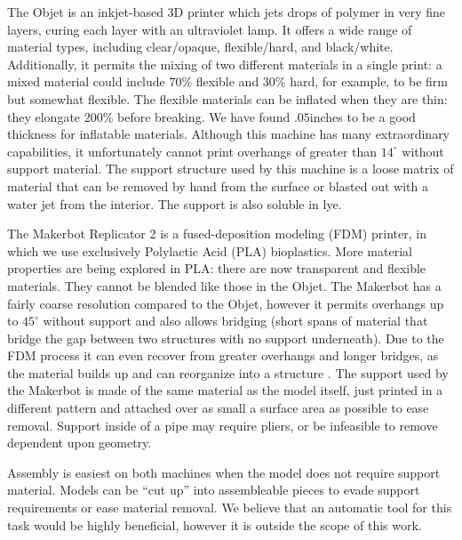 The Objet is an inkjet-based 3D printer which jets drops of polymer in very fine layers, curing each layer with an ultraviolet lamp.  It offers a wide range of material types, including clear/opaque, flexible/hard, and black/white.  Additionally, it permits the mixing of two different materials in a single print: a mixed material could include 70\% flexible and 30\% hard, for example, to be firm but somewhat flexible.  The flexible materials can be inflated when they are thin: they elongate 200\% before breaking.  We have found $.05$inches to be a good thickness for inflatable materials.  Although this machine has many extraordinary capabilities, it unfortunately cannot print overhangs of greater than $14^{\circ}$ without support material.  The support structure used by this machine is a loose matrix of material that can be removed by hand from the surface or blasted out with a water jet from the interior.  The support is also soluble in lye.

The Makerbot Replicator 2 is a fused-deposition modeling (FDM) printer, in which we use exclusively Polylactic Acid (PLA) bioplastics.  More material properties are being explored in PLA: there are now transparent and flexible materials.  They cannot be blended like those in the Objet.  The Makerbot has a fairly coarse resolution compared to the Objet, however it permits overhangs up to $45^{\circ}$ without support and also allows bridging (short spans of material that bridge the gap between two structures with no support underneath).  Due to the FDM process it can even recover from greater overhangs and longer bridges, as the material builds up and can reorganize into a structure .  The support used by the Makerbot is made of the same material as the model itself, just printed in a different pattern and attached over as small a surface area as possible to ease removal.  Support inside of a pipe may require pliers, or be infeasible to remove dependent upon geometry.

Assembly is easiest on both machines when the model does not require support material.  Models can be ``cut up'' into assembleable pieces to evade support requirements or ease material removal.  We believe that an automatic tool for this task would be highly beneficial, however it is outside the scope of this work.